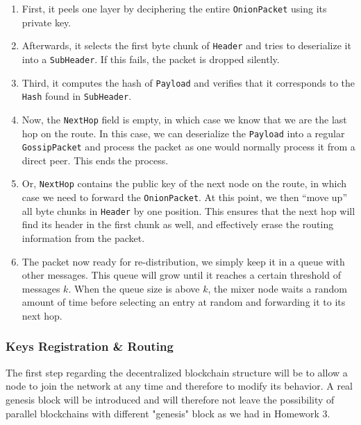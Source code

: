 \documentclass[11pt, a4paper]{article}
\begin{document}
            \begin{enumerate}
                \item First, it peels one layer by deciphering the entire \texttt{OnionPacket} using its private key.

                \item Afterwards, it selects the first byte chunk of \texttt{Header} and tries to deserialize it into a \texttt{SubHeader}. If this fails, the packet is dropped silently.

                \item Third, it computes the hash of \texttt{Payload} and verifies that it corresponds to the \texttt{Hash} found in \texttt{SubHeader}.

                \item Now,  the \texttt{NextHop} field is empty, in which case we know that we are the last hop on the route.
                In this case, we can deserialize the \texttt{Payload} into a regular \texttt{GossipPacket} and process the packet as one would normally process it from a direct peer. This ends the process.
                \item Or, \texttt{NextHop} contains the public key of the next node on the route, in which case we need to forward the \texttt{OnionPacket}.
                At this point, we then ``move up'' all byte chunks in \texttt{Header} by one position.
                This ensures that the next hop will find its header in the first chunk as well, and effectively erase the routing information from the packet.
                \item The packet now ready for re-distribution, we simply keep it in a queue with other messages.
                This queue will grow until it reaches a certain threshold of messages $k$.
                When the queue size is above $k$, the mixer node waits a random amount of time before selecting an entry at random and forwarding it to its next hop.

            \end{enumerate}



        \subsubsection{Keys Registration \& Routing}

           The first step regarding the decentralized blockchain structure will be to allow a node to join the network at any time and therefore to modify its behavior.
           A real genesis block will be introduced and will therefore not leave the possibility of parallel blockchains with different "genesis" block as we had in Homework 3.
\end{document}
